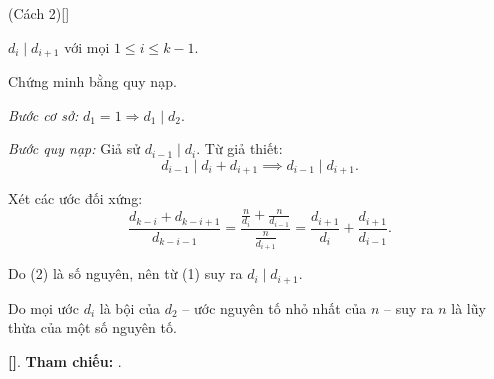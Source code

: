 \documentclass[../2023-n-s.tex]{subfiles}
\begin{document}
\begin{soln}(Cách 2)[\footnotemark]

    \begin{claim*}
        \( d_i \mid d_{i+1} \) với mọi \( 1 \leq i \leq k - 1 \).
    \end{claim*}
    \begin{subproof}
        Chứng minh bằng quy nạp.

        \textit{Bước cơ sở:} \( d_1 = 1 \Rightarrow d_1 \mid d_2 \).

        \textit{Bước quy nạp:} Giả sử \( d_{i-1} \mid d_i \). Từ giả thiết:
        \[
            d_{i-1} \mid d_i + d_{i+1} \implies d_{i-1} \mid d_{i+1}. \tag{1}
        \]

        Xét các ước đối xứng:
        \[
            \frac{d_{k-i} + d_{k-i+1}}{d_{k-i-1}} 
            = \frac{\frac{n}{d_i} + \frac{n}{d_{i-1}}}{\frac{n}{d_{i+1}}}
            = \frac{d_{i+1}}{d_i} + \frac{d_{i+1}}{d_{i-1}}. \tag{2}
        \]

        Do (2) là số nguyên, nên từ (1) suy ra \( d_i \mid d_{i+1} \).
    \end{subproof}

    Do mọi ước \( d_i \) là bội của \( d_2 \) – ước nguyên tố nhỏ nhất của \( n \) – suy ra \( n \) là lũy thừa của một số nguyên tố.

    \vspace{1em}
    \textbf{[]}.
    \textbf{Tham chiếu:}  .
\end{soln}


\newpage
\end{document}
